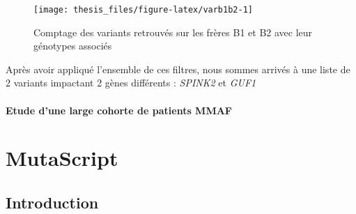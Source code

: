 \documentclass[12pt,twoside]{reedthesis}
\theoremstyle{definition}
\theoremstyle{definition}
\theoremstyle{remark}
\begin{document}
  \begin{figure}
  
  {\centering \texttt{[image: thesis\_files/figure-latex/varb1b2-1]} 
  
  }
  
  \caption[Comptage des variants retrouvés sur les frères B1 et B2 avec leur génotypes associés]{Comptage des variants retrouvés sur les frères B1 et B2 avec leur génotypes associés}\label{fig:varb1b2}
  \end{figure}
  
  Après avoir appliqué l'ensemble de ces filtres, nous sommes arrivés à
  une liste de 2 variants impactant 2 gènes différents : \emph{SPINK2} et
  \emph{GUF1}
  
  \subsubsection{Etude d'une large cohorte de patients
  MMAF}\label{etude-dune-large-cohorte-de-patients-mmaf}
  
  \chapter{MutaScript}\label{mutascript}
  
  \section{Introduction}\label{introduction}
  
\end{document}
